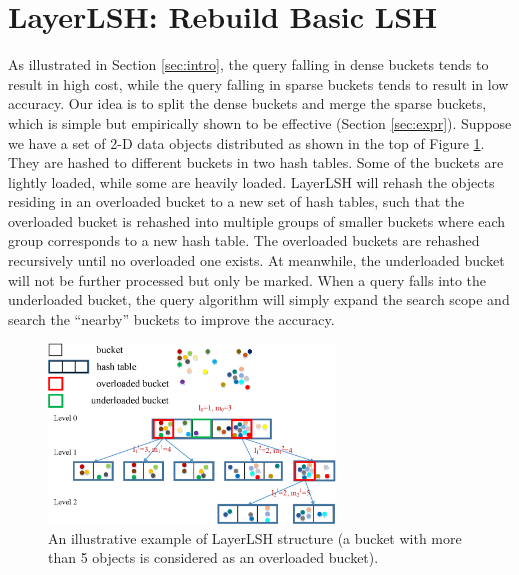 \section{LayerLSH: Rebuild Basic LSH}
\label{sec:reclsh}



As illustrated in Section \ref{sec:intro}, the query falling in dense buckets tends to result in high cost, while the query falling in sparse buckets tends to result in low accuracy. Our idea is to split the dense buckets and merge the sparse buckets, which is simple but empirically shown to be effective (Section \ref{sec:expr}). Suppose we have a set of 2-D data objects distributed as shown in the top of Figure \ref{fig:overview}. They are hashed to different buckets in two hash tables. Some of the buckets are lightly loaded, while some are heavily loaded. LayerLSH will rehash the objects residing in an overloaded bucket to a new set of hash tables, such that the overloaded bucket is rehashed into multiple groups of smaller buckets where each group corresponds to a new hash table. The overloaded buckets are rehashed recursively until no overloaded one exists. At meanwhile, the underloaded bucket will not be further processed but only be marked. When a query falls into the underloaded bucket, the query algorithm will simply expand the search scope and search the ``nearby'' buckets to improve the accuracy.

\begin{figure}[t]
\vspace{-0.1in}
    \centerline{\includegraphics[width=3in]{fig/overview.eps}}
     \vspace{-0.05in}
    \caption{An illustrative example of LayerLSH structure (a bucket with more than 5 objects is considered as an overloaded bucket).}
    \label{fig:overview}
    \vspace{-0.2in}
\end{figure}

